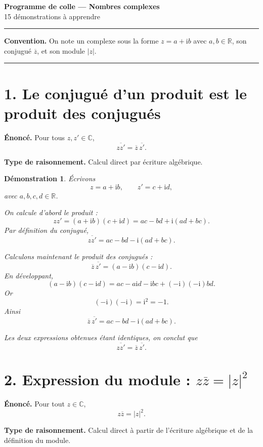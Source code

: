\documentclass[11pt,a4paper]{article}
\newtheorem{prop}{Démonstration}
\newcommand{\C}{\mathbb{C}}
\newcommand{\R}{\mathbb{R}}
\newcommand{\ii}{\mathrm{i}}
\begin{document}
\begin{center}
    {\LARGE \textbf{Programme de colle --- Nombres complexes}}\\[0.5em]
    {\large 15 démonstrations à apprendre}
\end{center}

\vspace{1em}

\hrule
\vspace{1em}

\textbf{Convention.} On note un complexe sous la forme $z=a+\ii b$ avec $a,b\in\R$, son conjugué $\overline z$, et son module $|z|$.

\vspace{1em}
\hrule
\vspace{1em}

\section*{1. Le conjugué d'un produit est le produit des conjugués}

\textbf{Énoncé.} Pour tous $z,z'\in\C$,
\[
\overline{zz'}=\overline z\,\overline{z'}.
\]

\textbf{Type de raisonnement.} Calcul direct par écriture algébrique.

\begin{prop}
Écrivons
\[
z=a+\ii b,\qquad z'=c+\ii d,
\]
avec $a,b,c,d\in\R$.

On calcule d'abord le produit :
\[
zz'=(a+\ii b)(c+\ii d)=ac-bd+\ii(ad+bc).
\]
Par définition du conjugué,
\[
\overline{zz'}=ac-bd-\ii(ad+bc).
\]

Calculons maintenant le produit des conjugués :
\[
\overline z\,\overline{z'}=(a-\ii b)(c-\ii d).
\]
En développant,
\[
(a-\ii b)(c-\ii d)=ac-a\ii d-\ii bc+(-\ii)(-\ii)bd.
\]
Or
\[
(-\ii)(-\ii)=\ii^2=-1.
\]
Ainsi
\[
\overline z\,\overline{z'}=ac-bd-\ii(ad+bc).
\]

Les deux expressions obtenues étant identiques, on conclut que
\[
\overline{zz'}=\overline z\,\overline{z'}.
\]
\end{prop}

\section*{2. Expression du module : \texorpdfstring{$z\overline z=|z|^2$}{zconj(z)=|z|²}}

\textbf{Énoncé.} Pour tout $z\in\C$,
\[
z\overline z=|z|^2.
\]

\textbf{Type de raisonnement.} Calcul direct à partir de l'écriture algébrique et de la définition du module.
\end{document}

